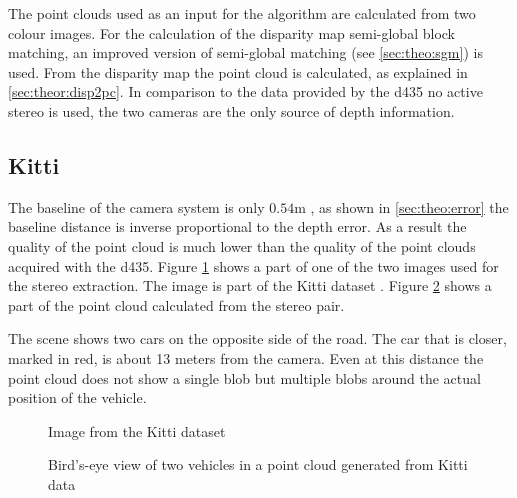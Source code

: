The point clouds used as an input for the algorithm are calculated from two colour images. For the calculation of the disparity map semi-global block matching, an improved version of semi-global matching (see \ref{sec:theo:sgm}) is used.
From the disparity map the point cloud is calculated, as explained in \ref{sec:theor:disp2pc}.
In comparison to the data provided by the \ac{d435} no active stereo is used, the two cameras are the only source of depth information.

\subsection{Kitti}
The baseline of the camera system is only $0.54\si{\m}$ \cite{Menze2015CVPR}, as shown in \ref{sec:theo:error} the baseline distance is inverse proportional to the depth error.
As a result the quality of the point cloud is much lower than the quality of the point clouds acquired with the \ac{d435}. 
Figure \ref{fig:eval:kittiBadImage} shows a part of one of the two images used for the stereo extraction. 
The image is part of the Kitti dataset \cite{Menze2015CVPR}. 
Figure \ref{fig:eval:kittiBad} shows a part of the point cloud calculated from the stereo pair.

The scene shows two cars on the opposite side of the road. 
The car that is closer, marked in red, is about 13 meters from the camera. 
Even at this distance the point cloud does not show a single blob but multiple blobs around the actual position of the vehicle.

\begin{figure}[h!]
    \centering
    \caption{Image from the Kitti dataset}
    \label{fig:eval:kittiBadImage}
\end{figure}

\begin{figure}[h!]
    \centering
    \caption{Bird's-eye view of two vehicles in a point cloud generated from Kitti data}
    \label{fig:eval:kittiBad}
\end{figure}

